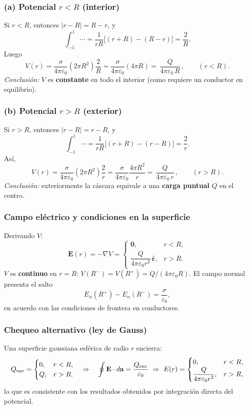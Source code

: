 \documentclass{article}
\begin{document}
\subsubsection*{(a) Potencial \texorpdfstring{$r<R$}{r<R} (interior)}
Si $r<R$, entonces $|r-R|=R-r$, y
\[
\int_{-1}^{1}\cdots=\frac{1}{rR}\big[(r+R)-(R-r)\big]=\frac{2}{R}.
\]
Luego
\[
V(r)=\frac{\sigma}{4\pi\varepsilon_0}(2\pi R^2)\frac{2}{R}
=\frac{\sigma}{4\pi\varepsilon_0}(4\pi R)
=\boxed{\,\frac{Q}{4\pi\varepsilon_0\,R}\,},\qquad (r<R).
\]
\emph{Conclusión:} $V$ es \textbf{constante} en todo el interior (como requiere un conductor en equilibrio).

\subsubsection*{(b) Potencial \texorpdfstring{$r>R$}{r>R} (exterior)}
Si $r>R$, entonces $|r-R|=r-R$, y
\[
\int_{-1}^{1}\cdots=\frac{1}{rR}\big[(r+R)-(r-R)\big]=\frac{2}{r}.
\]
Así,
\[
V(r)=\frac{\sigma}{4\pi\varepsilon_0}(2\pi R^2)\frac{2}{r}
=\frac{\sigma}{4\pi\varepsilon_0}\frac{4\pi R^2}{r}
=\boxed{\,\frac{Q}{4\pi\varepsilon_0\,r}\,},\qquad (r>R).
\]
\emph{Conclusión:} exteriormente la cáscara equivale a una \textbf{carga puntual} $Q$ en el centro.

\subsubsection*{Campo eléctrico y condiciones en la superficie}
Derivando $V$:
\[
\mathbf E(r)=-\nabla V=
\begin{cases}
\mathbf 0, & r<R,\\[4pt]
\dfrac{Q}{4\pi\varepsilon_0 r^2}\,\hat{\mathbf r}, & r>R.
\end{cases}
\]
$V$ es \textbf{continuo} en $r=R$: $V(R^-)=V(R^+)=Q/(4\pi\varepsilon_0R)$.  
El campo normal presenta el salto
\[
E_n(R^+)-E_n(R^-)=\frac{\sigma}{\varepsilon_0},
\]
en acuerdo con las condiciones de frontera en conductores.

\subsubsection*{Chequeo alternativo (ley de Gauss)}
Una superficie gaussiana esférica de radio $r$ encierra:
\[
Q_{\rm enc}=
\begin{cases}
0, & r<R,\\
Q, & r>R.
\end{cases}
\quad\Rightarrow\quad
\oint \mathbf E\cdot d\mathbf a=\dfrac{Q_{\rm enc}}{\varepsilon_0}
\ \Rightarrow\
E(r)=
\begin{cases}
0, & r<R,\\
\dfrac{Q}{4\pi\varepsilon_0 r^2}, & r>R,
\end{cases}
\]
lo que es consistente con los resultados obtenidos por integración directa del potencial.
\end{document}
